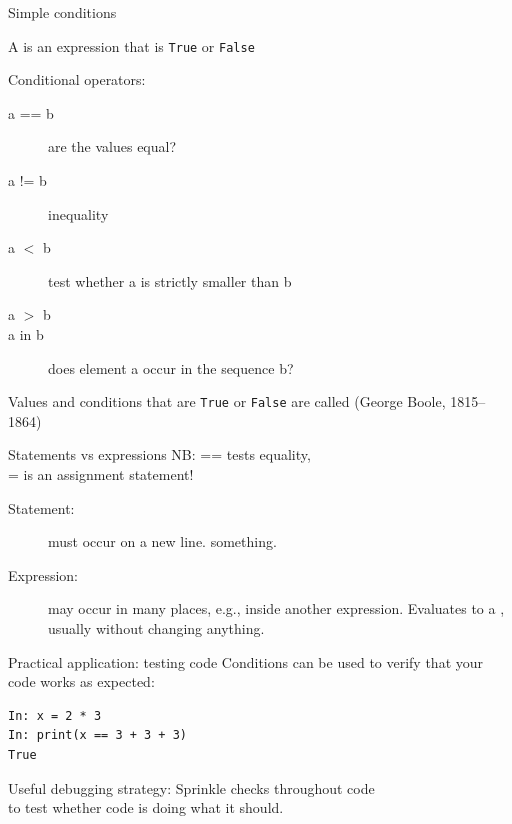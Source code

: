 \documentclass[aspectratio=169,usenames,dvipsnames]{beamer}
\begin{document}
\begin{frame}{Simple conditions}
    \begin{definition}
        A  is
        an expression that is \texttt{True} or \texttt{False}
    \end{definition}
    Conditional operators:
    \begin{description}
        \item[a == b] are the values equal?
        \item[a != b] inequality
        \item[a $<$ b] test whether a is strictly smaller than b
        \item[a $>$ b]
        \item[a in b] does element a occur in the sequence b?
    \end{description}

    Values and conditions that are \texttt{True} or \texttt{False}
    are called  (George Boole, 1815--1864)
\end{frame}

\begin{frame}{Statements vs expressions}
    NB: == tests equality, \\
           = is an assignment statement!

    \begin{description}
        \item[Statement:] must occur on a new line.  something.
        \item[Expression:] may occur in many places, e.g., inside another expression.
            Evaluates to a , usually without changing anything.
    \end{description}
\end{frame}

\begin{frame}[fragile]{Practical application: testing code}
Conditions can be used to verify that your code works as expected:
\begin{lstlisting}
In: x = 2 * 3
In: print(x == 3 + 3 + 3)
True
\end{lstlisting}

\begin{block}{Useful debugging strategy:}
Sprinkle checks throughout code \\
to test whether code is doing what it should.
\end{block}
\end{frame}
\end{document}
